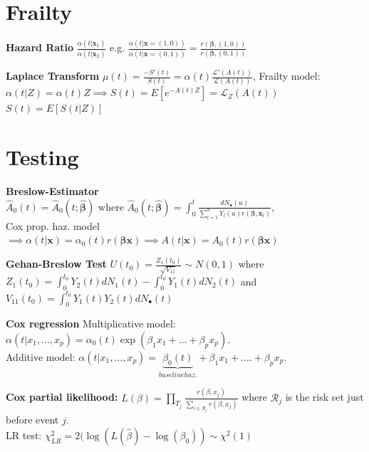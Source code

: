 \documentclass{article}
\begin{document}
\newpage

\section*{Frailty}

\textbf{Hazard Ratio} $\frac{\alpha(t|\mathbf{x}_1)}{\alpha(t|\mathbf{x}_2)}$ e.g. $\frac{\alpha(t|\mathbf{x} =(1,0))}{\alpha(t|\mathbf{x} =(0,1))} = \frac{r(\mathbf{\beta}, (1,0))}{r(\mathbf{\beta}, (0,1))}$

\medskip

\textbf{Laplace Transform} $\mu(t) = \frac{-S'(t)}{S(t)} = \alpha(t)\frac{\mathcal{L}'(A(t))}{\mathcal{L}(A(t))}$, Frailty model:  $\alpha(t|Z) = \alpha(t)Z \implies S(t)=E[e^{-A(t)Z}] = \mathcal{L}_Z(A(t))$\\
$S(t) = E[S(t|Z)]$

\newpage

\section*{Testing}

\textbf{Breslow-Estimator} $\hat A_0(t) = \hat A_0(t;\hat{\mathbf{\beta}}) \text{ where } 
\hat A_0(t;\hat{\mathbf{\beta}}) = \int_0^t\frac{dN_{\bullet}(u)}{\sum_{l=1}^n Y_l(u)r(\mathbf{\beta}, \mathbf{x}_l)}$, \\ 
Cox prop. haz. model $\implies \alpha(t | \mathbf{x}) = \alpha_0(t)r(\mathbf{\beta}\mathbf{x}) \implies A(t | \mathbf{x}) = A_0(t)r(\mathbf{\beta}\mathbf{x})$

\medskip

\textbf{Gehan-Breslow Test}
$U(t_0) = \frac{Z_1(t_0)}{\sqrt{V_{11}}} \sim N(0,1)$ where 
$Z_1(t_0) = \int_0^{t_0} Y_2(t)dN_1(t) -\int_0^{t_0} Y_1(t)dN_2(t)$ and 
$V_{11}(t_0) = \int_0^{t_0} Y_1(t)Y_2(t)dN_{\bullet}(t)$

\medskip

\textbf{Cox regression} Multiplicative model: $\alpha(t|x_1,...,x_p) = \alpha_0(t)\exp (\beta_1x_1+...+\beta_px_p)$. \\
Additive model:  $\alpha(t|x_1,...,x_p) = \underbrace{\beta_0(t)}_{baseline haz.} + \beta_1 x_1 + ....+ \beta_p x_p$.

\textbf{Cox partial likelihood:}
$L(\beta) = \prod_{T_j} \frac{r(\beta, x_j)}{\sum_{i \in \mathcal{R}_j} r(\beta, x_j)}$ where $\mathcal{R}_j$ is the risk set just before event $j$.\\ 
LR test: $\chi^2_{LR} = 2(\log (L(\hat{\beta}) - \log(\beta_0)) \sim \chi^2(1)$
\end{document}
